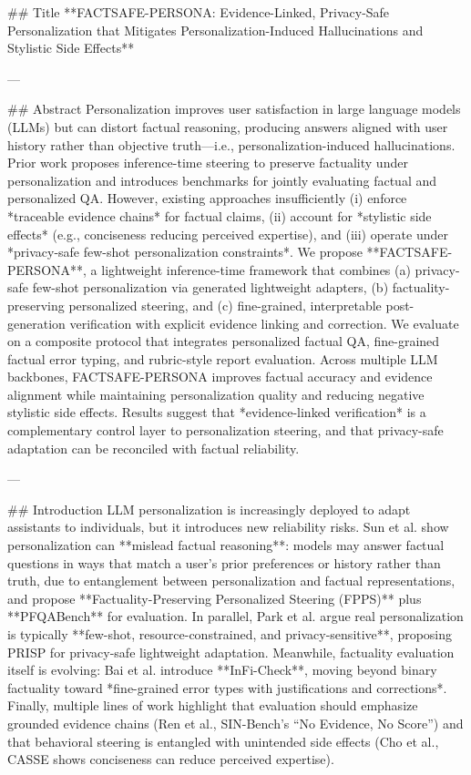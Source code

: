 ## Title  
**FACTSAFE-PERSONA: Evidence-Linked, Privacy-Safe Personalization that Mitigates Personalization-Induced Hallucinations and Stylistic Side Effects**

---

## Abstract  
Personalization improves user satisfaction in large language models (LLMs) but can distort factual reasoning, producing answers aligned with user history rather than objective truth—i.e., personalization-induced hallucinations. Prior work proposes inference-time steering to preserve factuality under personalization and introduces benchmarks for jointly evaluating factual and personalized QA. However, existing approaches insufficiently (i) enforce *traceable evidence chains* for factual claims, (ii) account for *stylistic side effects* (e.g., conciseness reducing perceived expertise), and (iii) operate under *privacy-safe few-shot personalization constraints*. We propose **FACTSAFE-PERSONA**, a lightweight inference-time framework that combines (a) privacy-safe few-shot personalization via generated lightweight adapters, (b) factuality-preserving personalized steering, and (c) fine-grained, interpretable post-generation verification with explicit evidence linking and correction. We evaluate on a composite protocol that integrates personalized factual QA, fine-grained factual error typing, and rubric-style report evaluation. Across multiple LLM backbones, FACTSAFE-PERSONA improves factual accuracy and evidence alignment while maintaining personalization quality and reducing negative stylistic side effects. Results suggest that *evidence-linked verification* is a complementary control layer to personalization steering, and that privacy-safe adaptation can be reconciled with factual reliability.

---

## Introduction  
LLM personalization is increasingly deployed to adapt assistants to individuals, but it introduces new reliability risks. Sun et al. show personalization can **mislead factual reasoning**: models may answer factual questions in ways that match a user’s prior preferences or history rather than truth, due to entanglement between personalization and factual representations, and propose **Factuality-Preserving Personalized Steering (FPPS)** plus **PFQABench** for evaluation. In parallel, Park et al. argue real personalization is typically **few-shot, resource-constrained, and privacy-sensitive**, proposing PRISP for privacy-safe lightweight adaptation. Meanwhile, factuality evaluation itself is evolving: Bai et al. introduce **InFi-Check**, moving beyond binary factuality toward *fine-grained error types with justifications and corrections*. Finally, multiple lines of work highlight that evaluation should emphasize grounded evidence chains (Ren et al., SIN-Bench’s “No Evidence, No Score”) and that behavioral steering is entangled with unintended side effects (Cho et al., CASSE shows conciseness can reduce perceived expertise).

